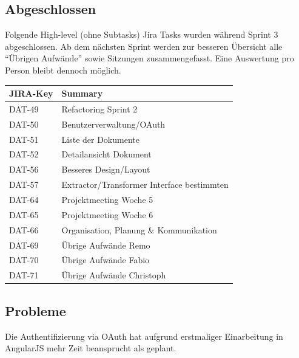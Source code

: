 \subsection*{Abgeschlossen}
Folgende High-level (ohne Subtasks) Jira Tasks wurden während Sprint 3 abgeschlossen. Ab dem nächsten Sprint werden zur besseren Übersicht alle ``Übrigen Aufwände'' sowie Sitzungen zusammengefasst. Eine Auswertung pro Person bleibt dennoch möglich.

\begin{table}[H]
\centering
\begin{tabular}{ll}
	\toprule
	\textbf{JIRA-Key} & \textbf{Summary}\\
	\midrule
DAT-49 & Refactoring Sprint 2\\
DAT-50 & Benutzerverwaltung/OAuth\\
DAT-51 & Liste der Dokumente\\
DAT-52 & Detailansicht Dokument\\
DAT-56 & Besseres Design/Layout\\
DAT-57 & Extractor/Transformer Interface bestimmten\\
DAT-64 & Projektmeeting Woche 5\\
DAT-65 & Projektmeeting Woche 6\\
DAT-66 & Organisation, Planung \& Kommunikation\\
DAT-69 & Übrige Aufwände Remo\\
DAT-70 & Übrige Aufwände Fabio\\
DAT-71 & Übrige Aufwände Christoph\\
	\bottomrule
\end{tabular}	
\end{table}

\subsection*{Probleme}
Die Authentifizierung via OAuth hat aufgrund erstmaliger Einarbeitung in AngularJS mehr Zeit beansprucht als geplant.
